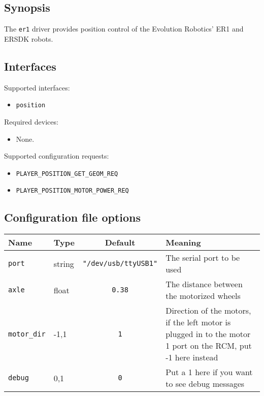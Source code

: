 \subsection*{Synopsis}
The {\tt er1} driver provides position control of the Evolution Robotics' ER1 and ERSDK robots.

\subsection*{Interfaces}

\noindent Supported interfaces:
\begin{itemize}
\item {\tt position}
\end{itemize}

\noindent Required devices:
\begin{itemize}
\item None.
\end{itemize}

\noindent Supported configuration requests:
\begin{itemize}
\item {\tt PLAYER\_POSITION\_GET\_GEOM\_REQ}
\item {\tt PLAYER\_POSITION\_MOTOR\_POWER\_REQ}
\end{itemize}

\subsection*{Configuration file options}

\begin{center}
{\small \begin{tabularx}{\columnwidth}{|l|l|c|X|}
\hline
Name & Type & Default & Meaning\\
\hline
{\tt port} & string & {\tt "/dev/usb/ttyUSB1"} & The serial port to be used\\
\hline
{\tt axle} & float & {\tt 0.38} & The distance between the motorized wheels\\
\hline
{\tt motor\_dir} & -1,1 & {\tt 1} & Direction of the motors, if the left motor is plugged in to the motor 1 port on the RCM, put -1 here instead\\
\hline
{\tt debug} & 0,1 & {\tt 0} & Put a 1 here if you want to see debug messages\\
\hline
\end{tabularx}}
\end{center}


